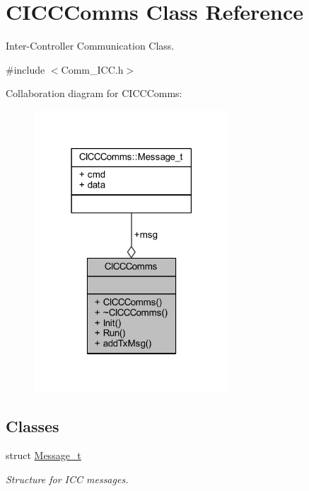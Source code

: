 \hypertarget{class_c_i_c_c_comms}{}\section{C\+I\+C\+C\+Comms Class Reference}
\label{class_c_i_c_c_comms}


Inter-\/\+Controller Communication Class.  




{\ttfamily \#include $<$Comm\+\_\+\+I\+C\+C.\+h$>$}



Collaboration diagram for C\+I\+C\+C\+Comms\+:\nopagebreak
\begin{figure}[H]
\begin{center}
\leavevmode
\includegraphics[width=207pt]{class_c_i_c_c_comms__coll__graph}
\end{center}
\end{figure}
\subsection*{Classes}
\begin{DoxyCompactItemize}
\item 
struct \mbox{\hyperlink{struct_c_i_c_c_comms_1_1_message__t}{Message\+\_\+t}}
\begin{DoxyCompactList}\small\item\em Structure for I\+CC messages. \end{DoxyCompactList}\end{DoxyCompactItemize}
